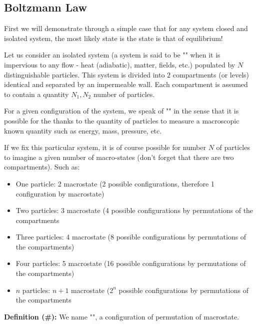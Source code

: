 	\subsection{Boltzmann Law}
	First we will demonstrate through a simple case that for any system closed and isolated system, the most likely state is the state is that of equilibrium!
	
	Let us consider an isolated system (a system is said to be "" when it is impervious to any flow - heat (adiabatic), matter, fields, etc.) populated by $N$ distinguishable particles. This system is divided into $2$ compartments (or levels) identical and separated by an impermeable wall. Each compartment is assumed to contain a quantity $N_1,N_2$ number of particles.
	
	For a given configuration of the system, we speak of "" in the sense that it is possible for the thanks to the quantity of particles to measure a macroscopic known quantity such as energy, mass, pressure, etc.
	
	If we fix this particular system, it is of course possible for number $N$ of particles to imagine a given number of macro-states (don't forget that there are two compartments). Such as:
	\begin{itemize}
		\item One particle: 2 macrostate (2 possible configurations, therefore 1 configuration by macrostate)

		\item Two particles: 3 macrostate (4 possible configurations by permutations of the compartments

		\item Three particles: 4 macrostate (8 possible configurations by permutations of the compartments)

		\item Four particles: 5 macrostate (16 possible configurations by permutations of the compartments)

		\item $n$ particles: $n+1$ macrostate  ($2^n$ possible configurations by permutations of the compartments
	\end{itemize}
	\textbf{Definition (\#\mydef):} We name "", a configuration of permutation of macrostate.
	
